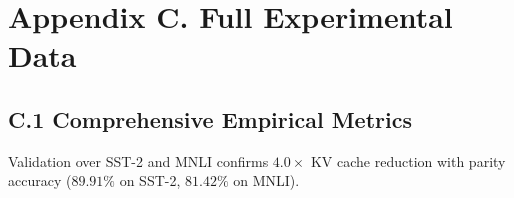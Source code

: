 \section{Appendix C. Full Experimental Data}
\subsection{C.1 Comprehensive Empirical Metrics}
Validation over SST-2 and MNLI confirms $4.0\times$ KV cache reduction with parity accuracy ($89.91\%$ on SST-2, $81.42\%$ on MNLI).
